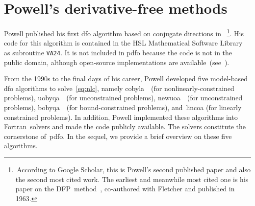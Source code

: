 \documentclass[11pt,draft]{article}
\numberwithin{equation}{section}
\def\dfp{\mbox{DFP}}
\def\fortran{\mbox{Fortran}}
\begin{document}
\section{Powell's derivative-free methods}
\label{sec:powell}

Powell published his first \gls{dfo} algorithm based on conjugate directions in \citeyear{Powell_1964}~\cite{Powell_1964}\footnote{\,According to Google Scholar, this is Powell's second published paper and also the second most cited work.
The earliest and meanwhile most cited one is his paper on the \dfp\ method~\cite{Fletcher_Powell_1963}, co-authored with Fletcher and published in 1963.}.
His code for this algorithm is contained in the HSL Mathematical Software Library~\cite{HSL} as subroutine \texttt{VA24}.
It is not included in \gls{pdfo} because the code is not in the public domain, although open-source implementations are available~(see~\cite[footnote~4]{Conn_Scheinberg_Toint_1997b}).

From the 1990s to the final days of his career, Powell developed five model-based \gls{dfo} algorithms to solve~\cref{eq:nlc}, namely \gls{cobyla}~\cite{Powell_1994}~(for nonlinearly-constrained problems), \gls{uobyqa}~\cite{Powell_2002}~(for unconstrained problems), \gls{newuoa}~\cite{Powell_2006}~(for unconstrained problems), \gls{bobyqa}~\cite{Powell_2009}~(for bound-constrained problems), and~\gls{lincoa} (for linearly constrained problems).
In addition, Powell implemented these algorithms into \fortran~solvers and made the code publicly available.
The solvers constitute the cornerstone of~\gls{pdfo}.
In the sequel, we provide a brief overview on these five algorithms.
\end{document}
